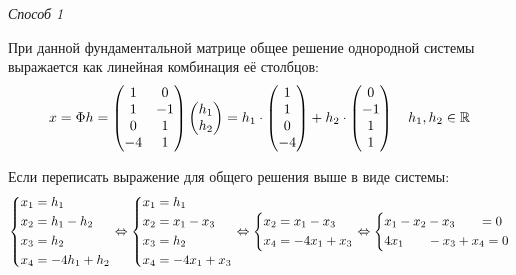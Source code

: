 \documentclass[a4paper,12pt]{article}
\begin{document}
  \begin{solution}
    \hphantom{X}\par  %
    
    \emph{Способ 1}
    
    При данной фундаментальной матрице общее решение однородной системы выражается как линейная комбинация её столбцов:
    \begin{equation*}
    \begin{split}
      x = \Phi h = \begin{pmatrix}
          1 & 0\\
          1 & -1\\
          0 & 1\\
          -4 & 1
        \end{pmatrix} \begin{pmatrix}
          h_1 \\ h_2
        \end{pmatrix}
      = h_1 \cdot \begin{pmatrix} 1 \\ 1 \\ 0 \\ -4 \end{pmatrix} +
         h_2 \cdot \begin{pmatrix} 0 \\ -1 \\ 1 \\ 1 \end{pmatrix} \quad h_1, h_2 \in \operatorname{\mathbb R}
    \end{split}
    \end{equation*}
    
    Если переписать выражение для общего решения выше в виде системы:
    \[
      \left\{
        \begin{aligned}
          &x_1 = h_1\\
          &x_2 = h_1 - h_2\\
          &x_3 = h_2\\
          &x_4 = -4h_1 + h_2
        \end{aligned}
      \right. \Leftrightarrow \left\{
        \begin{aligned}
          &x_1 = h_1\\
          &x_2 = x_1 - x_3\\
          &x_3 = h_2\\
          &x_4 = -4x_1 + x_3
        \end{aligned}
      \right. \Leftrightarrow \left\{
        \begin{aligned}
          &x_2 = x_1 - x_3\\
          &x_4 = -4x_1 + x_3
        \end{aligned}
      \right. \Leftrightarrow \left\{
        \begin{aligned}
          &x_1 - x_2 - x_3 \hphantom{+ x_4} = 0\\
          &4x_1 \hphantom{+ x_2} - x_3 + x_4 = 0
        \end{aligned}
      \right.
    \]
    

\end{solution}
\end{document}
